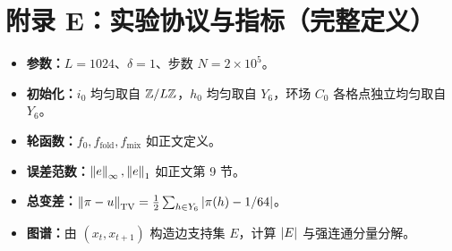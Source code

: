 \section{附录 E：实验协议与指标（完整定义）}

\begin{itemize}
  \item \textbf{参数：}$L=1024$、$\delta=1$、步数 $N=2\times 10^5$。
  \item \textbf{初始化：}$i_0$ 均匀取自 $\mathbb{Z}/L\mathbb{Z}$，$h_0$ 均匀取自 $Y_6$，环场 $C_0$ 各格点独立均匀取自 $Y_6$。
  \item \textbf{轮函数：}$f_0,f_{\mathrm{fold}},f_{\mathrm{mix}}$ 如正文定义。
  \item \textbf{误差范数：}$\left\lVert e\right\rVert_\infty,\left\lVert e\right\rVert_1$ 如正文第 9 节。
  \item \textbf{总变差：}$\left\lVert \pi-u\right\rVert_{\mathrm{TV}}=\frac12\sum_{h\in Y_6}\left\lvert \pi(h)-1/64\right\rvert$。
  \item \textbf{图谱：}由 $(x_t,x_{t+1})$ 构造边支持集 $E$，计算 $\left\lvert E\right\rvert$ 与强连通分量分解。
\end{itemize}

